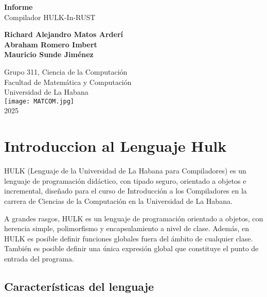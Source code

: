 \documentclass[a4paper, 12pt]{article}
\begin{document}
\graphicspath{{./}}

\begin{titlepage}
    \centering
    \vspace*{2cm}
    {\huge\bfseries Informe\\[0.4cm]}
    {\LARGE Compilador HULK-In-RUST\\}
    \vspace*{2cm}
    
     
    {\Large \textbf{Richard Alejandro Matos Arderí}\\[0.5cm]}
    {\Large \textbf{Abraham Romero Imbert}\\[0.5cm]}
    {\Large \textbf{Mauricio Sunde Jiménez}\\[0.5cm]}
    
    {\Large Grupo 311, Ciencia de la Computación\\[0.5cm]}
    {\Large Facultad de Matemática y Computación\\[0.5cm]}
    {\Large Universidad de La Habana\\[0.5cm]}
    \vfill
    \texttt{[image: MATCOM.jpg]}\\[0.5cm]
    {\Large 2025}
\end{titlepage}

\newpage
\tableofcontents
\newpage

\section{Introduccion al Lenguaje Hulk}

HULK (Lenguaje de la Universidad de La Habana para Compiladores) es un lenguaje de programación didáctico, con tipado seguro, orientado a objetos e incremental, diseñado para el curso de Introducción a los Compiladores en la carrera de Ciencias de la Computación en la Universidad de La Habana.

A grandes rasgos, HULK es un lenguaje de programación orientado a objetos, con herencia simple, polimorfismo y encapsulamiento a nivel de clase. Además, en HULK es posible definir funciones globales fuera del ámbito de cualquier clase. También es posible definir una única expresión global que constituye el punto de entrada del programa.

\subsection{Características del lenguaje}
\end{document}
